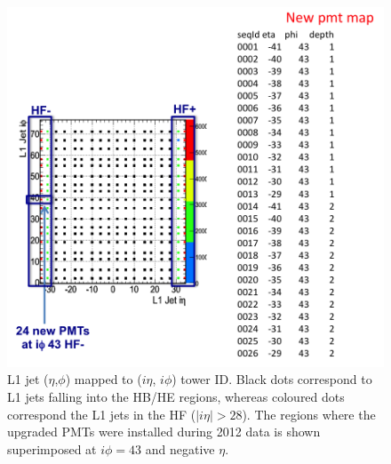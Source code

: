 \documentclass[11pt]{cmspaperpdf}
\begin{document}
\begin{figure}
\centering
\includegraphics[scale=0.7]{plots/upgradedPMTs_regions_in2012.png}
\caption{L1 jet ($\eta$,$\phi$) mapped to ($i \eta$, $i \phi$) tower ID. Black dots correspond to L1 jets falling into the HB/HE regions, whereas coloured dots correspond the L1 jets in the HF ($| i \eta| > 28$). The regions where the upgraded PMTs were installed during 2012 data is shown superimposed at $i \phi=43$ and negative $\eta$. }
\label{fig:newpmts} 
\end{figure}
 
\end{document}
